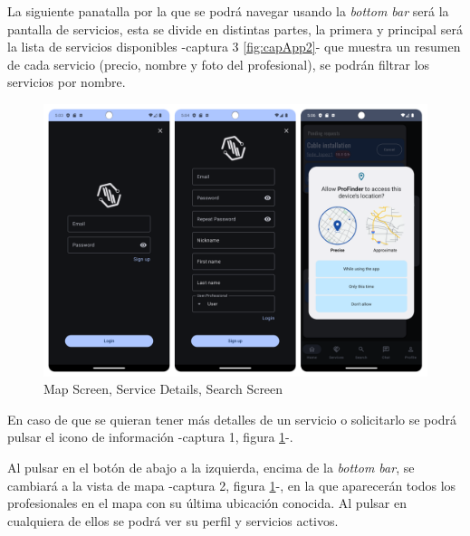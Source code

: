 La siguiente panatalla por la que se podrá navegar usando la \textit{bottom bar} será la pantalla de servicios, esta se divide en distintas partes, la primera y principal será la lista de servicios disponibles -captura 3 \ref{fig:capApp2}- que muestra un resumen de cada servicio (precio, nombre y foto del profesional), se podrán filtrar los servicios por nombre.
\newpage
\begin{figure}[h]
	\centering
	\includegraphics[width = 1\textwidth]{Imagenes/capturasApp/login_signup_local.png}
	\caption{Map Screen, Service Details, Search Screen}
	\label{fig:capApp3}
\end{figure}

En caso de que se quieran tener más detalles de un servicio o solicitarlo se podrá pulsar el icono de información -captura 1, figura \ref{fig:capApp3}-.

Al pulsar en el botón de abajo a la izquierda, encima de la \textit{bottom bar}, se cambiará a la vista de mapa -captura 2, figura \ref{fig:capApp3}-, en la que aparecerán todos los profesionales en el mapa con su última ubicación conocida. Al pulsar en cualquiera de ellos se podrá ver su perfil y servicios activos.

